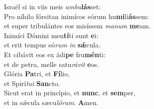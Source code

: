 \evenverse Israël si in viis meis \textit{am}\textit{bu}\textbf{lás}set:\\
\oddverse Pro níhilo fórsitan inimícos eórum hu\textbf{mi}li\textbf{ás}sem:~\*\\
\oddverse et super tribulántes eos misíssem \textit{ma}\textit{num} \textbf{me}am.\\
\evenverse Inimíci Dómini men\textbf{tí}ti sunt \textbf{e}i:~\*\\
\evenverse et erit tempus eó\textit{rum} \textit{in} \textbf{sǽ}cula.\\
\oddverse Et cibávit eos ex ádi\textbf{pe} fru\textbf{mén}ti:~\*\\
\oddverse et de petra, melle satu\textit{rá}\textit{vit} \textbf{e}os.\\
\evenverse Glória \textbf{Pa}tri, et \textbf{Fí}lio,~\*\\
\evenverse et Spirí\textit{tu}\textit{i} \textbf{San}cto.\\
\oddverse Sicut erat in princípio, et \textbf{nunc}, et \textbf{sem}per,~\*\\
\oddverse et in sǽcula sæcu\textit{ló}\textit{rum}. \textbf{A}men.\\
